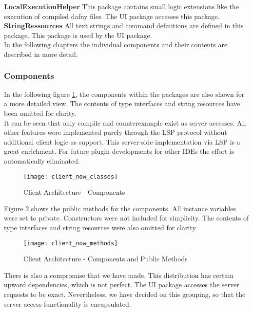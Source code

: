 {\bf LocalExecutionHelper} \textendash{}
This package contains small logic extensions like the execution of compiled dafny files. The UI package accesses this package. \\

{\bf StringRessources} \textendash{}
All text strings and command definitions are defined in this package. This package is used by the UI package. \\

In the following chapters the individual components and their contents are described in more detail.

\subsubsection{Components}
In the following figure \ref{fig:client_now_classes}, the components within the packages are also shown for a more detailed view. The contents of type interfaces and string resources have been omitted for clarity. \\

It can be seen that only compile and counterexample exist as server accesses. All other features were implemented purely through the LSP protocol without additional client logic as support. This server-side implementation via LSP is a great enrichment. For future plugin developments for other IDEs the effort is automatically eliminated.

\begin{figure}[H]
    \centering
    \texttt{[image: client\_now\_classes]}
    \caption{Client Architecture - Components}
    \label{fig:client_now_classes}
\end{figure}


Figure \ref{fig:client_now_methods} shows the public methods for the components.
All instance variables were set to private. Constructors were not included for simplicity. The contents of type interfaces and string resources were also omitted for clarity

\begin{figure}[H]
    \centering
    \texttt{[image: client\_now\_methods]}
    \caption{Client Architecture - Components and Public Methods}
    \label{fig:client_now_methods}
\end{figure}

There is also a compromise that we have made.
This distribution has certain upward dependencies, which is not perfect.
The UI package accesses the server requests to be exact.
Nevertheless, we have decided on this grouping,
so that the server access functionality is encapsulated.

